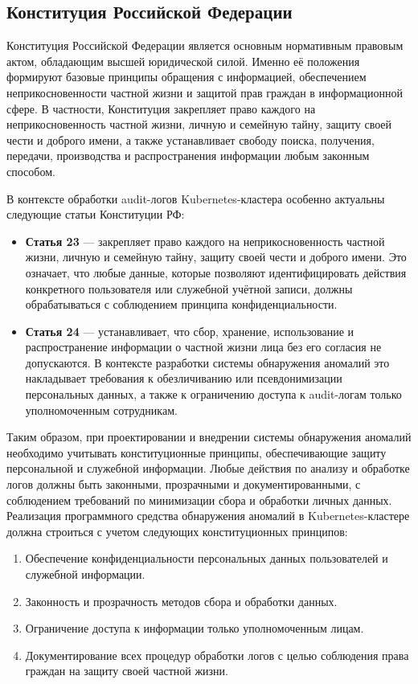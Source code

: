 \subsection{Конституция Российской Федерации}

Конституция Российской Федерации является основным нормативным правовым актом, обладающим высшей юридической силой. Именно её положения формируют базовые принципы обращения с информацией, обеспечением неприкосновенности частной жизни и защитой прав граждан в информационной сфере. В частности, Конституция закрепляет право каждого на неприкосновенность частной жизни, личную и семейную тайну, защиту своей чести и доброго имени, а также устанавливает свободу поиска, получения, передачи, производства и распространения информации любым законным способом.

В контексте обработки audit-логов Kubernetes-кластера особенно актуальны следующие статьи Конституции РФ:

\begin{itemize}
    \item \textbf{Статья 23} — закрепляет право каждого на неприкосновенность частной жизни, личную и семейную тайну, защиту своей чести и доброго имени. Это означает, что любые данные, которые позволяют идентифицировать действия конкретного пользователя или служебной учётной записи, должны обрабатываться с соблюдением принципа конфиденциальности.
    \item \textbf{Статья 24} — устанавливает, что сбор, хранение, использование и распространение информации о частной жизни лица без его согласия не допускаются. В контексте разработки системы обнаружения аномалий это накладывает требования к обезличиванию или псевдонимизации персональных данных, а также к ограничению доступа к audit-логам только уполномоченным сотрудникам.
\end{itemize}

Таким образом, при проектировании и внедрении системы обнаружения аномалий необходимо учитывать конституционные принципы, обеспечивающие защиту персональной и служебной информации. Любые действия по анализу и обработке логов должны быть законными, прозрачными и документированными, с соблюдением требований по минимизации сбора и обработки личных данных. Реализация программного средства обнаружения аномалий в Kubernetes-кластере должна строиться с учетом следующих конституционных принципов:

\begin{enumerate}
    \item Обеспечение конфиденциальности персональных данных пользователей и служебной информации.
    \item Законность и прозрачность методов сбора и обработки данных.
    \item Ограничение доступа к информации только уполномоченным лицам.
    \item Документирование всех процедур обработки логов с целью соблюдения права граждан на защиту своей частной жизни.
\end{enumerate}
